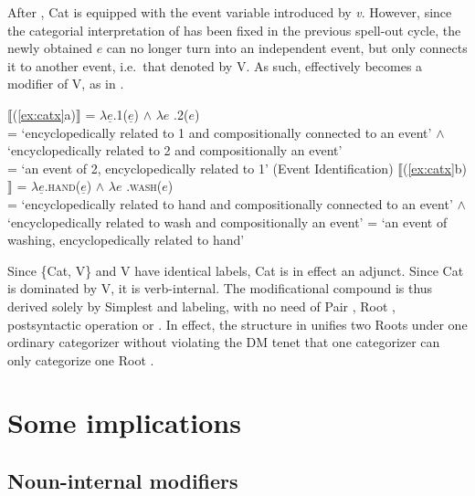 \documentclass[output=paper]{langsci/langscibook}
\begin{document}
\noindent After , Cat\textsubscript{\textsurd} is equipped with the event variable introduced by {\em v}. However, since the categorial interpretation of {} has been fixed in the previous spell-out cycle, the newly obtained $e$ can no longer turn {} into an independent event, but only connects it to another event, i.e.\ that denoted by V\textsubscript{\textsurd}. As such, {} effectively becomes a modifier of V\textsubscript{\textsurd}, as in .

\ea\label{ex:sem3}
\ea\label{ex:sem3a}
{\upshape
$⟦$(\ref{ex:catx}a)$⟧$ = $\lambda \underline{e}$.1($\underline{e}$) $\wedge$ $\lambda e$ .2($e$)\\ = `encyclopedically related to 1 and compositionally connected to an event' $\wedge$ `encyclopedically related to 2 and compositionally an event' \\ = `an event of 2, encyclopedically related to 1' \hfill (Event Identification)
}
\ex\label{ex:sem3b}
{\upshape
$⟦$(\ref{ex:catx}b)$⟧$ = $\lambda \underline{e}$.\textsc{hand}($\underline{e}$) $\wedge$ $\lambda e$ .\textsc{wash}($e$)\\ = `encyclopedically related to hand and compositionally connected to an event' $\wedge$ `encyclopedically related to wash and compositionally an event' = `an event of washing, encyclopedically related to hand'
}
\z
\z

Since \{Cat\textsubscript{\textsurd}, V\textsubscript{\textsurd}\} and
V\textsubscript{\textsurd} have identical labels, Cat\textsubscript{\textsurd}
is in effect an adjunct. Since Cat\textsubscript{\textsurd} is dominated by V,
it is verb-internal. The modificational compound is thus derived solely by Simplest  and labeling, with no need of Pair , Root , postsyntactic operation or . In effect, the structure in  unifies two Roots under one ordinary categorizer without violating the \gls{DM} tenet that one categorizer can only categorize one Root \citep[cf.][]{Embick2010}.

\section{Some implications}\label{sec5}

\subsection{Noun-internal modifiers}\label{sec5.1}
\end{document}
